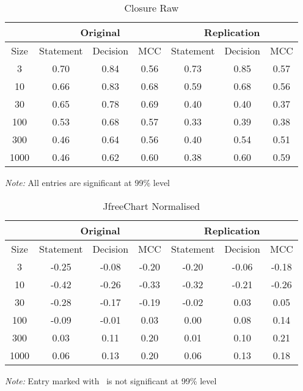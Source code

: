 \begin{table}[h]
	\caption{Closure Raw}
	\label{tab:jfreeraw}
	\begin{minipage}{0.7\columnwidth}
		\begin{center}
			\begin{tabular}{cccc|ccc}
				\toprule
				& \multicolumn{3}{c}{Original} & \multicolumn{3}{c}{Replication} \\
				\hline
				Size & Statement & Decision & MCC & Statement & Decision & MCC  \\
				\hline
				3   & 0.70 & 0.84 & 0.56 & 0.73 & 0.85 & 0.57\\
				10  & 0.66 & 0.83 & 0.68 & 0.59 & 0.68 & 0.56\\
				30  & 0.65 & 0.78 & 0.69 & 0.40  & 0.40  & 0.37 \\
				100 & 0.53 & 0.68 & 0.57 & 0.33  & 0.39  & 0.38 \\
				300 & 0.46 & 0.64 & 0.56 & 0.40  & 0.54  & 0.51 \\
				1000 & 0.46 & 0.62 & 0.60 & 0.38  & 0.60 & 0.59 \\
				\bottomrule
			\end{tabular}
		\end{center}
		\bigskip
		\emph{Note:} All entries are significant at 99\% level
	\end{minipage}
\end{table}

\begin{table}[h]
	\caption{JfreeChart Normalised}
	\label{tab:jfreenorm}
	\begin{minipage}{0.7\columnwidth}
		\begin{center}
			\begin{tabular}{cccc|ccc}
				\toprule
				& \multicolumn{3}{c}{Original} & \multicolumn{3}{c}{Replication} \\
				\hline
				Size & Statement & Decision & MCC & Statement & Decision & MCC  \\
				\hline
				3   & -0.25 & -0.08 & -0.20 & -0.20 & -0.06\textborn & -0.18\\
				10  & -0.42 & -0.26 & -0.33 & -0.32 & -0.21 & -0.26\\
				30  & -0.28 & -0.17 & -0.19 & -0.02\textborn  & 0.03\textborn  & 0.05\textborn \\
				100 & -0.09 & -0.01\textborn & 0.03\textborn & 0.00\textborn  & 0.08  & 0.14 \\
				300 & 0.03\textborn & 0.11 & 0.20 & 0.01\textborn  & 0.10  & 0.21 \\
				1000 & 0.06 & 0.13 & 0.20 &0.06\textborn  & 0.13 & 0.18 \\
				\bottomrule
			\end{tabular}
		\end{center}
		\bigskip
		\emph{Note:} Entry marked with \textborn~is not significant at 99\% level
	\end{minipage}
\end{table}

